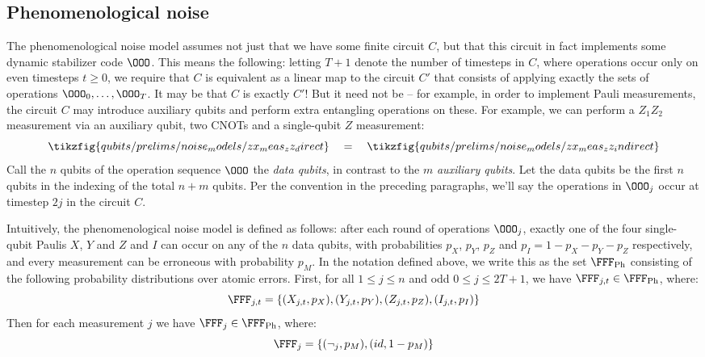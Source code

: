
\subsection{Phenomenological noise}

The phenomenological noise model assumes not just that we have some finite circuit $C$, but that this circuit in fact implements some dynamic stabilizer code $\OOO$.
This means the following: letting $T+1$ denote the number of timesteps in $C$, where operations occur only on even timesteps $t \geq 0$, we require that $C$ is equivalent as a linear map to the circuit $C'$ that consists of applying exactly the sets of operations $\OOO_0, \ldots, \OOO_T$.
It may be that $C$ is exactly $C'$!
But it need not be -- for example, in order to implement Pauli measurements, the circuit $C$ may introduce auxiliary qubits and perform extra entangling operations on these.
For example, we can perform a $Z_1 Z_2$ measurement via an auxiliary qubit, two CNOTs and a single-qubit $Z$ measurement:
\begin{equation}
    \tikzfig{qubits/prelims/noise_models/zx_meas_zz_direct}
    \quad = \quad
    \tikzfig{qubits/prelims/noise_models/zx_meas_zz_indirect}
\end{equation}
Call the $n$ qubits of the operation sequence $\OOO$ the \textit{data qubits}, in contrast to the $m$ \textit{auxiliary qubits}.
Let the data qubits be the first $n$ qubits in the indexing of the total $n + m$ qubits.
Per the convention in the preceding paragraphs, we'll say the operations in $\OOO_j$ occur at timestep $2j$ in the circuit $C$.

Intuitively, the phenomenological noise model is defined as follows: after each round of operations $\OOO_j$, exactly one of the four single-qubit Paulis $X$, $Y$ and $Z$ and $I$ can occur on any of the $n$ data qubits, with probabilities $p_X$, $p_Y$, $p_Z$ and $p_I = 1 - p_X - p_Y - p_Z$ respectively, and every measurement can be erroneous with probability $p_M$.
In the notation defined above, we write this as the set $\FFF_{\text{Ph}}$ consisting of the following probability distributions over atomic errors.
First, for all $1 \leq j \leq n$ and odd $0 \leq j \leq 2T+1$, we have $\FFF_{j,t} \in \FFF_{\text{Ph}}$, where:
\begin{equation}
    \FFF_{j,t} = \{(X_{j,t}, p_X), (Y_{j,t}, p_Y), (Z_{j,t}, p_Z), (I_{j,t}, p_I)\}
\end{equation}
Then for each measurement $j$ we have $\FFF_j \in \FFF_{\text{Ph}}$, where:
\begin{equation}
    \FFF_j = \{(\neg_j, p_M), (id, 1 - p_M)\}
\end{equation}

